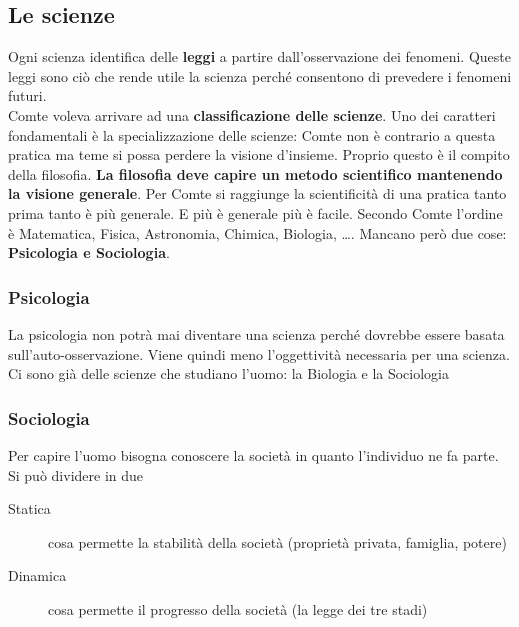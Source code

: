 \subsection{Le scienze}
Ogni scienza identifica delle \textbf{leggi} a partire dall'osservazione dei fenomeni. Queste leggi
sono ciò che rende utile la scienza perché consentono di prevedere i fenomeni futuri.\\
Comte voleva arrivare ad una \textbf{classificazione delle scienze}. Uno dei caratteri fondamentali
è la specializzazione delle scienze: Comte non è contrario a questa pratica ma teme si possa perdere
la visione d'insieme. Proprio questo è il compito della filosofia. \textbf{La filosofia deve capire
un metodo scientifico mantenendo la visione generale}. Per Comte si raggiunge la scientificità di una
pratica tanto prima tanto è più generale. E più è generale più è facile. Secondo Comte l'ordine è
Matematica, Fisica, Astronomia, Chimica, Biologia, \ldots. Mancano però due cose: \textbf{Psicologia
e Sociologia}.

\subsubsection{Psicologia}
La psicologia non potrà mai diventare una scienza perché dovrebbe essere basata 
sull'auto-osservazione. Viene quindi meno l'oggettività necessaria per una scienza. Ci sono già delle
scienze che studiano l'uomo: la Biologia e la Sociologia

\subsubsection{Sociologia}
Per capire l'uomo bisogna conoscere la società in quanto l'individuo ne fa parte. Si può dividere in
due
\begin{description}
  \item[Statica] cosa permette la stabilità della società (proprietà privata, famiglia, potere)
  \item[Dinamica] cosa permette il progresso della società (la legge dei tre stadi)
\end{description}
